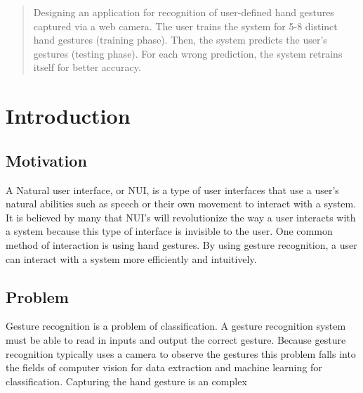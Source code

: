 \documentclass{article}
\begin{document}

\begin{abstract}
Designing an application for recognition of user-defined hand gestures captured via a web camera. The user trains the system for 5-8 distinct hand gestures (training phase). Then, the system predicts the user’s gestures (testing phase). For each wrong prediction, the system retrains itself for better accuracy.
\end{abstract}

\section{Introduction}
\label{Intro}
\subsection{Motivation}
A Natural user interface, or NUI, is a type of user interfaces that use a user’s natural abilities such as speech or their own movement to interact with a system. It is believed by many that NUI's will revolutionize the way a user interacts with a system because this type of interface is invisible to the user. One common method of interaction is using hand gestures. By using gesture recognition, a user can interact with a system more efficiently and intuitively.
\subsection{Problem}
Gesture recognition is a problem of classification. A gesture recognition system must be able to read in inputs and output the correct gesture. Because gesture recognition typically uses a camera to observe the gestures this problem falls into the fields of computer vision for data extraction and machine learning for classification. Capturing the hand gesture is an complex\
\end{document}
